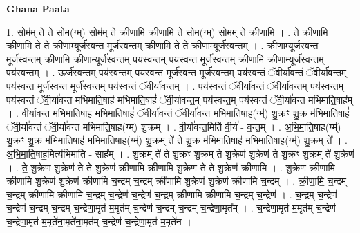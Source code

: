 \documentclass[17pt]{extarticle}
\begin{document}
\textbf{Ghana Paata } \newline

1. सोम॑म् ते ते॒ सोम॒(ग्म्॒) सोम॑म् ते क्रीणामि क्रीणामि ते॒ सोम॒(ग्म्॒) सोम॑म् ते क्रीणामि । . ते॒ क्री॒णा॒मि॒ क्री॒णा॒मि॒ ते॒ ते॒ क्री॒णा॒म्यूर्ज॑स्वन्त॒ मूर्ज॑स्वन्तम् क्रीणामि ते ते क्रीणा॒म्यूर्ज॑स्वन्तम् । . क्री॒णा॒म्यूर्ज॑स्वन्त॒ मूर्ज॑स्वन्तम् क्रीणामि क्रीणा॒म्यूर्ज॑स्वन्त॒म् पय॑स्वन्त॒म् पय॑स्वन्त॒ मूर्ज॑स्वन्तम् क्रीणामि क्रीणा॒म्यूर्ज॑स्वन्त॒म् पय॑स्वन्तम् । . ऊर्ज॑स्वन्त॒म् पय॑स्वन्त॒म् पय॑स्वन्त॒ मूर्ज॑स्वन्त॒ मूर्ज॑स्वन्त॒म् पय॑स्वन्तं ॅवी॒र्या॑वन्तं ॅवी॒र्या॑वन्त॒म् पय॑स्वन्त॒ मूर्ज॑स्वन्त॒ मूर्ज॑स्वन्त॒म् पय॑स्वन्तं ॅवी॒र्या॑वन्तम् । . पय॑स्वन्तं ॅवी॒र्या॑वन्तं ॅवी॒र्या॑वन्त॒म् पय॑स्वन्त॒म् पय॑स्वन्तं ॅवी॒र्या॑वन्त मभिमाति॒षाह॑ मभिमाति॒षाहं॑ ॅवी॒र्या॑वन्त॒म् पय॑स्वन्त॒म् पय॑स्वन्तं ॅवी॒र्या॑वन्त मभिमाति॒षाह᳚म् । . वी॒र्या॑वन्त मभिमाति॒षाह॑ मभिमाति॒षाहं॑ ॅवी॒र्या॑वन्तं ॅवी॒र्या॑वन्त मभिमाति॒षाह(ग्म्॑) शु॒क्रꣳ शु॒क्र म॑भिमाति॒षाहं॑ ॅवी॒र्या॑वन्तं ॅवी॒र्या॑वन्त मभिमाति॒षाह(ग्म्॑) शु॒क्रम् । . वी॒र्या॑वन्त॒मिति॑ वी॒र्य॑ - व॒न्त॒म् । . अ॒भि॒मा॒ति॒षाह(ग्म्॑) शु॒क्रꣳ शु॒क्र म॑भिमाति॒षाह॑ मभिमाति॒षाह(ग्म्॑) शु॒क्रम् ते॑ ते शु॒क्र म॑भिमाति॒षाह॑ मभिमाति॒षाह(ग्म्॑) शु॒क्रम् ते᳚ । . अ॒भि॒मा॒ति॒षाह॒मित्य॑भिमाति - साह᳚म् । . शु॒क्रम् ते॑ ते शु॒क्रꣳ शु॒क्रम् ते॑ शु॒क्रेण॑ शु॒क्रेण॑ ते शु॒क्रꣳ शु॒क्रम् ते॑ शु॒क्रेण॑ । . ते॒ शु॒क्रेण॑ शु॒क्रेण॑ ते ते शु॒क्रेण॑ क्रीणामि क्रीणामि शु॒क्रेण॑ ते ते शु॒क्रेण॑ क्रीणामि । . शु॒क्रेण॑ क्रीणामि क्रीणामि शु॒क्रेण॑ शु॒क्रेण॑ क्रीणामि च॒न्द्रम् च॒न्द्रम् क्री॑णामि शु॒क्रेण॑ शु॒क्रेण॑ क्रीणामि च॒न्द्रम् । . क्री॒णा॒मि॒ च॒न्द्रम् च॒न्द्रम् क्री॑णामि क्रीणामि च॒न्द्रम् च॒न्द्रेण॑ च॒न्द्रेण॑ च॒न्द्रम् क्री॑णामि क्रीणामि च॒न्द्रम् च॒न्द्रेण॑ । . च॒न्द्रम् च॒न्द्रेण॑ च॒न्द्रेण॑ च॒न्द्रम् च॒न्द्रम् च॒न्द्रेणा॒मृत॑ म॒मृत॑म् च॒न्द्रेण॑ च॒न्द्रम् च॒न्द्रम् च॒न्द्रेणा॒मृत᳚म् । . च॒न्द्रेणा॒मृत॑ म॒मृत॑म् च॒न्द्रेण॑ च॒न्द्रेणा॒मृत॑ म॒मृते॑ना॒मृते॑ना॒मृत॑म् च॒न्द्रेण॑ च॒न्द्रेणा॒मृत॑ म॒मृते॑न । \newline
\end{document}
